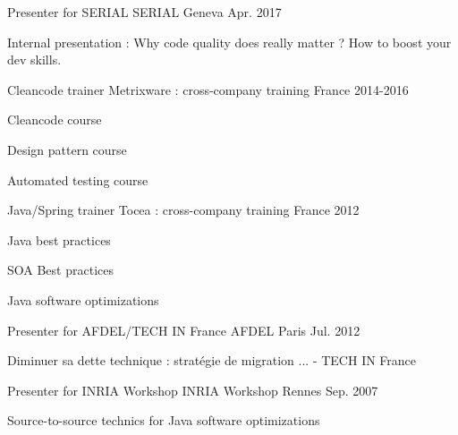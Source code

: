 \begin{cventries}
\cventry
{Presenter for SERIAL} %
{SERIAL} %
{Geneva} %
{Apr. 2017} %
{
    \begin{cvitems} %
        \item {Internal presentation : Why code quality does really matter ? How to boost your dev skills.}
    \end{cvitems}
}
\cventry
{Cleancode trainer} %
{Metrixware : cross-company training} %
{France} %
{2014-2016} %
{
    \begin{cvitems} %
        \item {Cleancode course}
        \item {Design pattern course}
        \item {Automated testing course}
    \end{cvitems}
} 
\cventry
{Java/Spring trainer} %
{Tocea : cross-company training} %
{France} %
{2012} %
{
    \begin{cvitems} %
        \item {Java best practices}
        \item {SOA Best practices}
        \item {Java software optimizations}
    \end{cvitems}
}
  \cventry
    {Presenter for AFDEL/TECH IN France} %
    {AFDEL} %
    {Paris} %
    {Jul. 2012} %
    {
      \begin{cvitems} %
        \item {Diminuer sa dette technique : stratégie de migration ... - TECH IN France}
      \end{cvitems}
    }

  \cventry
    {Presenter for INRIA Workshop} %
    {INRIA Workshop} %
    {Rennes} %
    {Sep. 2007} %
    {
      \begin{cvitems} %
        \item {Source-to-source technics for Java software optimizations}
      \end{cvitems}
    }

\end{cventries}

